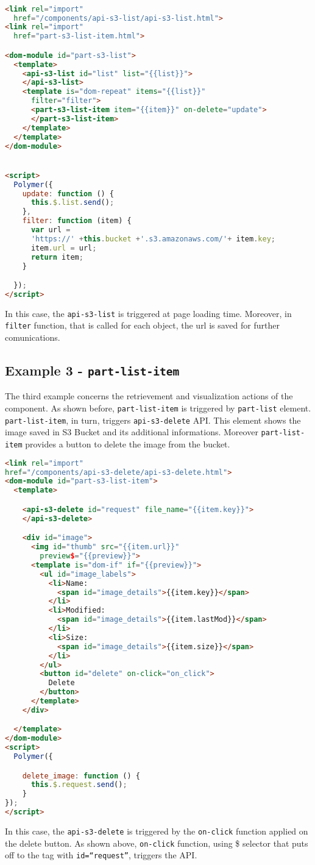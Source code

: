 \begin{lstlisting}[language=html]

<link rel="import"
  href="/components/api-s3-list/api-s3-list.html">
<link rel="import"
  href="part-s3-list-item.html">

<dom-module id="part-s3-list">
  <template>
    <api-s3-list id="list" list="{{list}}">
    </api-s3-list>
    <template is="dom-repeat" items="{{list}}"
      filter="filter">
      <part-s3-list-item item="{{item}}" on-delete="update">
      </part-s3-list-item>
    </template>
  </template>
</dom-module>


<script>
  Polymer({
    update: function () {
      this.$.list.send();
    },
    filter: function (item) {
      var url = 
      'https://' +this.bucket +'.s3.amazonaws.com/'+ item.key;
      item.url = url;
      return item;
    }

  });
</script>

\end{lstlisting}

In this case, the \texttt{api-s3-list} is triggered at page loading time.
Moreover, in \texttt{filter} function, that is called for each object, the url is saved for further comunications.

\subsection{Example 3 - \texttt{part-list-item}}

The third example concerns the retrievement and visualization actions of the component.
As shown before, \texttt{part-list-item} is triggered by \texttt{part-list} element. \texttt{part-list-item}, in turn, triggers \texttt{api-s3-delete} API.
This element shows the image saved in S3 Bucket and its additional informations. Moreover \texttt{part-list-item} provides a button to delete the image from the bucket.

\begin{lstlisting}[language=html]
<link rel="import" 
href="/components/api-s3-delete/api-s3-delete.html">
<dom-module id="part-s3-list-item">
  <template>

    <api-s3-delete id="request" file_name="{{item.key}}">
    </api-s3-delete>

    <div id="image">
      <img id="thumb" src="{{item.url}}" 
        preview$="{{preview}}">
      <template is="dom-if" if="{{preview}}">
        <ul id="image_labels">
          <li>Name: 
            <span id="image_details">{{item.key}}</span>
          </li>
          <li>Modified: 
            <span id="image_details">{{item.lastMod}}</span>
          </li>
          <li>Size: 
            <span id="image_details">{{item.size}}</span>
          </li>
        </ul>
        <button id="delete" on-click="on_click">
          Delete
        </button>
      </template>
    </div>

  </template>
</dom-module>
<script>
  Polymer({

    delete_image: function () {
      this.$.request.send();
    }
});
</script>
\end{lstlisting}


In this case, the \texttt{api-s3-delete} is triggered by the \texttt{on-click} function applied on the delete button. As shown above, \texttt{on-click} function, using \$ selector that puts off to the tag with \texttt{id=``request''}, triggers the API.

